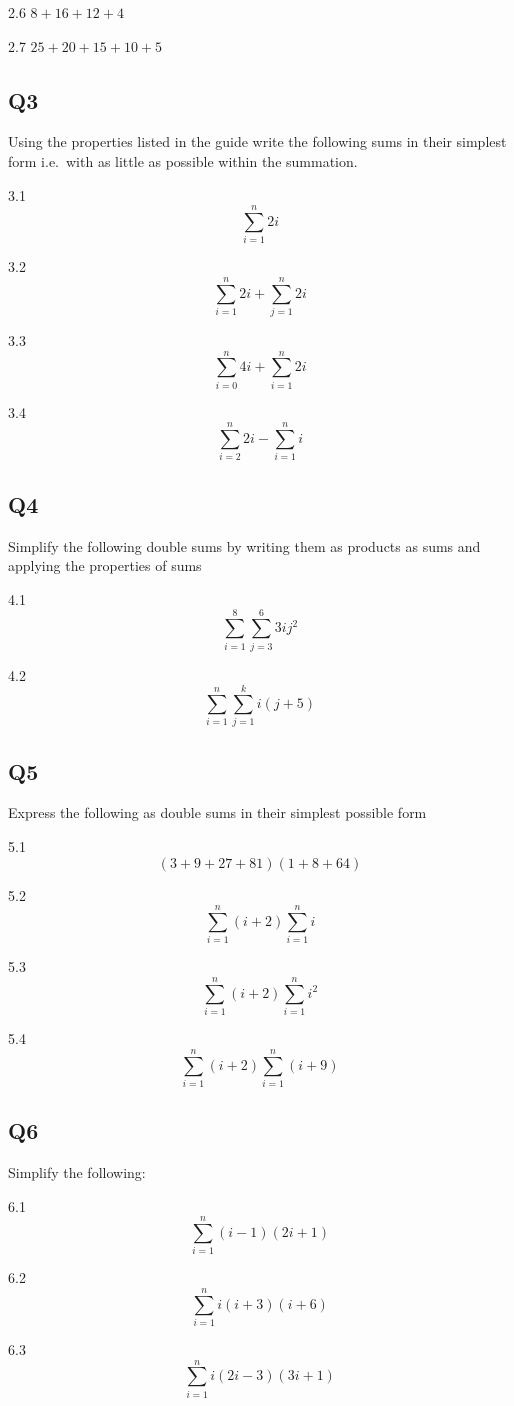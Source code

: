 \documentclass[
  12pt,
  a4paper, oneside]{starmastarticle}
\begin{document}
2.6 \(8 + 16 + 12 + 4\)

2.7 \(25 + 20 + 15 + 10 + 5\)

\hypertarget{q3}{%
\subsection*{Q3}\label{q3}}

Using the properties listed in the guide write the following sums in
their simplest form i.e.~with as little as possible within the
summation.

3.1 \[\sum_{i = 1}^{n} 2i\]

3.2 \[\sum_{i = 1}^{n} 2i + \sum_{j = 1}^{n} 2i\]

3.3 \[\sum_{i = 0}^{n} 4i + \sum_{i = 1}^{n} 2i\]

3.4 \[\sum_{i = 2}^{n} 2i - \sum_{i = 1}^{n} i\]

\hypertarget{q4}{%
\subsection*{Q4}\label{q4}}

Simplify the following double sums by writing them as products as sums
and applying the properties of sums

4.1 \[\sum_{i=1}^{8}\sum_{j=3}^6 3ij^2\]

4.2 \[\sum_{i=1}^{n}\sum_{j=1}^k i(j+5)\]

\hypertarget{q5}{%
\subsection*{Q5}\label{q5}}

Express the following as double sums in their simplest possible form

5.1 \[(3+9+27+81)(1+8+64)\]

5.2 \[\sum_{i=1}^{n}(i+2)\sum_{i=1}^{n} i\]

5.3 \[\sum_{i=1}^{n}(i+2)\sum_{i=1}^{n} i^2\]

5.4 \[\sum_{i=1}^{n}(i+2)\sum_{i=1}^{n} (i+9)\]

\hypertarget{q6}{%
\subsection*{Q6}\label{q6}}

Simplify the following:

6.1 \[\sum_{i = 1}^{n} (i-1)(2i+1)\]

6.2 \[\sum_{i = 1}^{n} i(i+3)(i+6)\]

6.3 \[\sum_{i = 1}^{n} i(2i-3)(3i+1)\]
\end{document}
